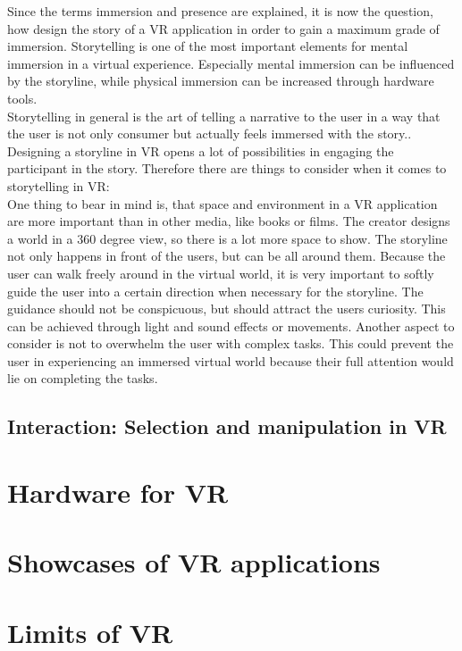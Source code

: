 Since the terms immersion and presence are explained, it is now the question, how design the story of a VR application in order to gain a maximum grade of immersion. Storytelling is one of the most important elements for mental immersion in a virtual experience. Especially mental immersion can be influenced by the storyline, while physical immersion can be increased through hardware tools. \\
Storytelling in general is the art of telling a narrative to the user in a way that the user is not only consumer but actually feels immersed with the story.\cite{Louden.2018}. Designing a storyline in VR opens a lot of possibilities in engaging the participant in the story. Therefore there are things to consider when it comes to storytelling in VR: \cite{Keane.2018}\\
One thing to bear in mind is, that space and environment in a VR application are more important than in other media, like books or films. The creator designs a world in a 360 degree view, so there is a lot more space to show. The storyline not only happens in front of the users, but can be all around them. Because the user can walk freely around in the virtual world, it is very important to softly guide the user into a certain direction when necessary for the storyline. The guidance should not be conspicuous, but should attract the users curiosity. This can be achieved through light and sound effects or movements. Another aspect to consider is not to overwhelm the user with complex tasks. This could prevent the user in experiencing an immersed virtual world because their full attention would lie on completing the tasks.
\subsection{Interaction: Selection and manipulation in VR}
\section{Hardware for VR}
\section{Showcases of VR applications}

\section{Limits of VR}
